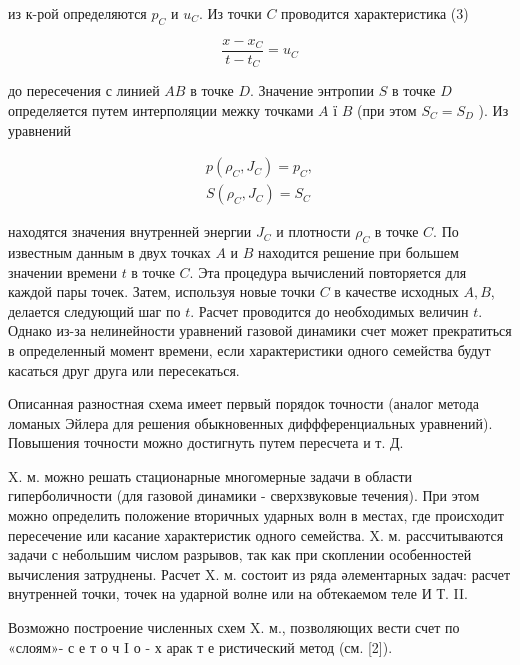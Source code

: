 \documentclass[10pt]{article}
\begin{document}
из к-рой определяются $p_{C}$ и $u_{C}$. Из точки $C$ проводится характеристика (3)



\[

\frac{x-x_{C}}{t-t_{C}}=u_{C}

\]



до пересечения с линией $A B$ в точке $D$. Значение энтропии $S$ в точке $D$ определяется путем интерполяции межку точками $A$ ї $B$ (при этом $S_{C}=S_{D}$ ). Из уравнений



\[

\begin{gathered}

p\left(\rho_{C}, J_{C}\right)=p_{C}, \\

S\left(\rho_{C}, J_{C}\right)=S_{C}

\end{gathered}

\]



находятся значения внутренней энергии $J_{C}$ и плотности $\rho_{C}$ в точке $C$. По известным данным в двух точках $A$ и $B$ находится решение при большем значении времени $t$ в точке $C$. Эта процедура вычислений повторяется для каждой пары точек. Затем, используя новые точки $C$ в качестве исходных $A, B$, делается следующий шаг по $t$. Расчет проводится до необходимых величин $t$. Однако из-за нелинейности уравнений газовой динамики счет может прекратиться в определенный момент времени, если характеристики одного семейства будут касаться друг друга или пересекаться.



Описанная разностная схема имеет первый порядок точности (аналог метода ломаных Эйлера для решения обыкновенных диффференциальных уравнений). Повышения точности можно достигнуть путем пересчета и т. Д.



X. м. можно решать стационарные многомерные задачи в области гиперболичности (для газовой динамики - сверхзвуковые течения). При этом можно определить положение вторичных ударных волн в местах, где происходит пересечение или касание характеристик одного семейства. X. м. рассчитываются задачи с небольшим числом разрывов, так как при скоплении особенностей вычисления затруднены. Расчет X. м. состоит из ряда әлементарных задач: расчет внутренней точки, точек на ударной волне или на обтекаемом теле И Т. II.



Возможно построение численных схем X. м., позволяющих вести счет по «слоям»- с е т о ч I о - х арак т е ристический метод (см. [2]).
\end{document}
